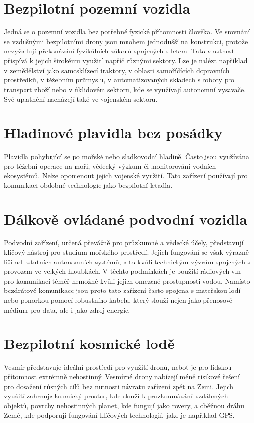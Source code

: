 \documentclass[12pt]{report}
\begin{document}
\section{Bezpilotní pozemní vozidla}
Jedná se o pozemní vozidla bez potřebné fyzické přítomnosti člověka. Ve srovnání se vzdušnými bezpilotními drony jsou mnohem jednodušší na konstrukci, protože nevyžadují překonávání fyzikálních zákonů spojených s letem. Tato vlastnost přispívá k jejich širokému využití napříč různými sektory. Lze je nalézt například v zemědělství jako samosklízecí traktory, v oblasti samořídících dopravních prostředků, v těžebním průmyslu, v automatizovaných skladech s roboty pro transport zboží nebo v úklidovém sektoru, kde se využívají autonomní vysavače. Své uplatnění nacházejí také ve vojenském sektoru. \cite{mainbook}

\section{Hladinové plavidla bez posádky}
Plavidla pohybující se po mořské nebo sladkovodní hladině. Často jsou využívána pro těžební operace na moři, vědecký výzkum či monitorování vodních ekosystémů. Nelze opomenout jejich vojenské využití. Tato zařízení používají pro komunikaci obdobné technologie jako bezpilotní letadla. \cite{mainbook}

\section{Dálkově ovládané podvodní vozidla}
Podvodní zařízení, určená převážně pro průzkumné a vědecké účely, představují klíčový nástroj pro studium mořského prostředí. Jejich fungování se však výrazně liší od ostatních autonomních systémů, a to kvůli technickým výzvám spojených s provozem ve velkých hloubkách. V těchto podmínkách je použití rádiových vln pro komunikaci téměř nemožné kvůli jejich omezené prostupnosti vodou. Namísto bezdrátové komunikace jsou proto tato zařízení často spojena s mateřskou lodí nebo ponorkou pomocí robustního kabelu, který slouží nejen jako přenosové médium pro data, ale i jako zdroj energie. \cite{mainbook}

\section{Bezpilotní kosmické lodě}
Vesmír představuje ideální prostředí pro využití dronů, neboť je pro lidskou přítomnost extrémně nehostinný. Vesmírné drony nabízejí méně rizikové řešení pro dosažení různých cílů bez nutnosti návratu zařízení zpět na Zemi. Jejich využití zahrnuje kosmický prostor, kde slouží k prozkoumávání vzdálených objektů, povrchy nehostinných planet, kde fungují jako rovery, a oběžnou dráhu Země, kde podporují fungování klíčových technologií, jako je například GPS. \cite{mainbook}\\
\end{document}
